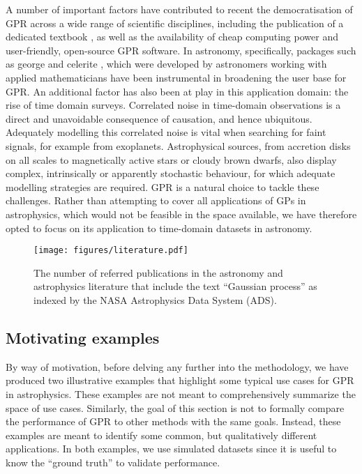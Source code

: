 \documentclass[letterpaper]{ar-1col}
\begin{document}
A number of important factors have contributed to recent the democratisation of GPR across a wide range of scientific disciplines, including the publication of a dedicated textbook \citep{gpml}, as well as the availability of cheap computing power and user-friendly, open-source GPR software. In astronomy, specifically, packages such as {\sc george} \citep{george} and {\sc celerite} \citep{celerite}, which were developed by astronomers working with applied mathematicians have been instrumental in broadening the user base for GPR. An additional factor has also been at play in this application domain: the rise of time domain surveys. Correlated noise in time-domain observations is a direct and unavoidable consequence of causation, and hence ubiquitous. Adequately modelling this correlated noise is vital when searching for faint signals, for example from exoplanets. Astrophysical sources, from accretion disks on all scales to magnetically active stars or cloudy brown dwarfs, also display complex, intrinsically or apparently stochastic behaviour, for which adequate modelling strategies are required. GPR is a natural choice to tackle these challenges. Rather than attempting to cover all applications of GPs in astrophysics, which would not be feasible in the space available, we have therefore opted to focus on its application to time-domain datasets in astronomy.

\begin{figure}[ht]
  \centering
  \texttt{[image: figures/literature.pdf]}
  \caption{The number of referred publications in the astronomy and astrophysics literature that include the text ``Gaussian process'' as indexed by the NASA Astrophysics Data System (ADS). }
  \label{fig:literature}
\end{figure}

\subsection{Motivating examples}
\label{sec:sim_examples}

By way of motivation, before delving any further into the methodology, we have produced two illustrative examples that highlight some typical use cases for GPR in astrophysics.
These examples are not meant to comprehensively summarize the space of use cases.
Similarly, the goal of this section is not to formally compare the performance of GPR to other methods with the same goals.
Instead, these examples are meant to identify some common, but qualitatively different applications.
In both examples, we use simulated datasets since it is useful to know the ``ground truth'' to validate performance.
\end{document}
